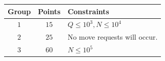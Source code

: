 \begin{center}
\begin{tabular}{| c | c | p{12cm} |}
  \hline
  \textbf{Group} & \textbf{Points} & \textbf{Constraints} \\ \hline
  $1$    & $15$  & $Q \le 10^3, N \le 10^4$ \\ \hline
  $2$    & $25$  & No move requests will occur. \\ \hline
  $3$    & $60$  & $N \le 10^5$ \\ \hline
\end{tabular}
\end{center}
